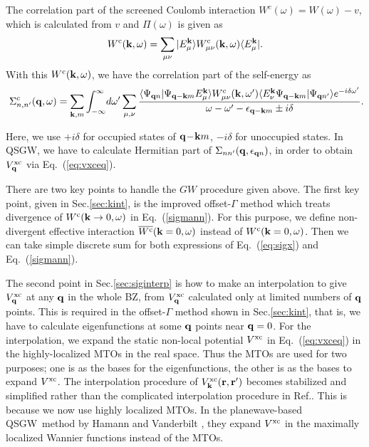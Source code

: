 \documentclass[twocolumn,showpacs,preprintnumbers,amsmath,amssymb,floatfix]{revtex4-1}
\newcommand{\bfq}{{\bf q}}
\newcommand{\bfk}{{\bf k}}
\newcommand{\bfr}{{\bf r}}
\def\Psiqn{{\Psi_{{\bf q}n}}}
\def\vxc{V^{\rm xc}}
\newcommand{\req}[1]{\mbox{Eq.~\!(\ref{#1})}}
\def\Psiqkm{{\Psi_{{\bf q}-{\bf k}m}}}
\def\Psiqnp{{\Psi_{{\bf q}n'}}}
\def\Psiqn{{\Psi_{{\bf q}n}}}
\def\QSGW{QS{GW}}
\begin{document}
\begin{widetext}
The correlation part of the screened Coulomb interaction $W^c(\omega)=W(\omega)-v$, 
which is calculated from $v$ and $\Pi(\omega)$ is given as
\begin{eqnarray}
W^{\rm c}(\bfk,\omega)=\sum_{\mu\nu} | E^{\bfk}_\mu \rangle {W^{\rm c}_{\mu\nu}(\bfk,\omega)} 
\langle E^{\bfk}_\mu |.
\end{eqnarray}
With this $W^{\rm c}(\bfk,\omega)$, we have the correlation part of the self-energy  as
\begin{eqnarray}\
\Sigma^{\rm c}_{n,n'}(\bfq,\omega)= \sum_{\bfk,m} \int_{-\infty}^\infty  \!d \omega' \sum_{\mu,\nu} 
\frac{\langle\Psiqn|\Psiqkm E^{\bfk}_\mu \rangle 
W^{\rm c}_{\mu\nu}(\bfk,\omega')\langle E^{\bfk}_\nu \Psiqkm
|\Psiqnp\rangle e^{-i \delta \omega'}}
{\omega-\omega'-\epsilon_{\bfq-\bfk m}\pm i \delta}.
\label{sigmann}
\end{eqnarray}
\end{widetext}
Here, we use $+i \delta$ for occupied states of
${\bfq\!-\!\bfk m}$, $-i \delta$ for unoccupied states.
In QSGW, 
we have to calculate Hermitian part of $\Sigma_{nn'}(\bfq,\epsilon_{\bfq n})$, 
in order to obtain $\vxc_\bfq$ via \req{eq:vxceq}.

There are two key points to handle the $GW$ procedure given above.
The first key point, given in Sec.\ref{sec:kint},
is the improved offset-$\Gamma$ method which treats
divergence of $W^{\rm c}(\bfk \to 0,\omega)$ in \req{sigmann}. 
For this purpose, we define non-divergent 
effective interaction $\overline{W^{\rm c}}(\bfk=0,\omega)$ instead of
${W^{\rm c}}(\bfk=0,\omega)$.
Then we can take simple discrete sum for both expressions of \req{eq:sigx} and \req{sigmann}.

The second point in Sec.\ref{sec:siginterp} is
how to make 
an interpolation to give $\vxc_\bfq$ at any $\bfq$ in the whole BZ,
from $\vxc_\bfq$ calculated only at limited numbers of $\bfq$ points.
This is required in the offset-$\Gamma$ method shown in Sec.\ref{sec:kint},
that is, we have to calculate eigenfunctions at some $\bfq$ points near $\bfq=0$.
For the interpolation, we expand the static
non-local potential $\vxc$ in \req{eq:vxceq} in the highly-localized
MTOs in the real space. Thus the MTOs are used for two purposes;
one is as the bases for the eigenfunctions, the other is as the bases to
expand $\vxc$. The interpolation procedure of $\vxc_\bfk(\bfr,\bfr')$
becomes stabilized and simplified rather than the
complicated interpolation procedure in 
Ref..
This is because we now use highly localized MTOs.
In the planewave-based \QSGW\ method by Hamann and Vanderbilt \cite{hamann09}, 
they expand $\vxc$ in the maximally localized Wannier functions instead of the MTOs.
\end{document}
